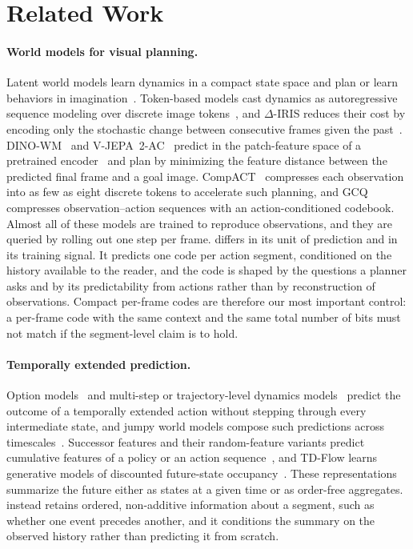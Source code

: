 \section{Related Work}
\label{sec:related}

\paragraph{World models for visual planning.}
Latent world models learn dynamics in a compact state space and plan or learn behaviors in imagination~\cite{hafner2019planet,hafner2023dreamerv3,hansen2024tdmpc2}.
Token-based models cast dynamics as autoregressive sequence modeling over discrete image tokens~\cite{micheli2023iris}, and $\Delta$-IRIS reduces their cost by encoding only the stochastic change between consecutive frames given the past~\cite{micheli2024deltairis}.
DINO-WM~\cite{zhou2025dinowm} and V-JEPA~2-AC~\cite{assran2025vjepa2} predict in the patch-feature space of a pretrained encoder~\cite{oquab2024dinov2,bardes2024vjepa} and plan by minimizing the feature distance between the predicted final frame and a goal image.
CompACT~\cite{kim2026compact} compresses each observation into as few as eight discrete tokens to accelerate such planning, and GCQ~\cite{peng2025gcq} compresses observation--action sequences with an action-conditioned codebook.
Almost all of these models are trained to reproduce observations, and they are queried by rolling out one step per frame.
\method differs in its unit of prediction and in its training signal.
It predicts one code per action segment, conditioned on the history available to the reader, and the code is shaped by the questions a planner asks and by its predictability from actions rather than by reconstruction of observations.
Compact per-frame codes are therefore our most important control: a per-frame code with the same context and the same total number of bits must not match \method if the segment-level claim is to hold.

\paragraph{Temporally extended prediction.}
Option models~\cite{sutton1999options} and multi-step or trajectory-level dynamics models~\cite{lambert2021longterm,ding2024dwm} predict the outcome of a temporally extended action without stepping through every intermediate state, and jumpy world models compose such predictions across timescales~\cite{farebrother2026jumpy}.
Successor features and their random-feature variants predict cumulative features of a policy or an action sequence~\cite{barreto2017sf,chen2023ramp}, and TD-Flow learns generative models of discounted future-state occupancy~\cite{farebrother2025tdflow}.
These representations summarize the future either as states at a given time or as order-free aggregates.
\method instead retains ordered, non-additive information about a segment, such as whether one event precedes another, and it conditions the summary on the observed history rather than predicting it from scratch.

